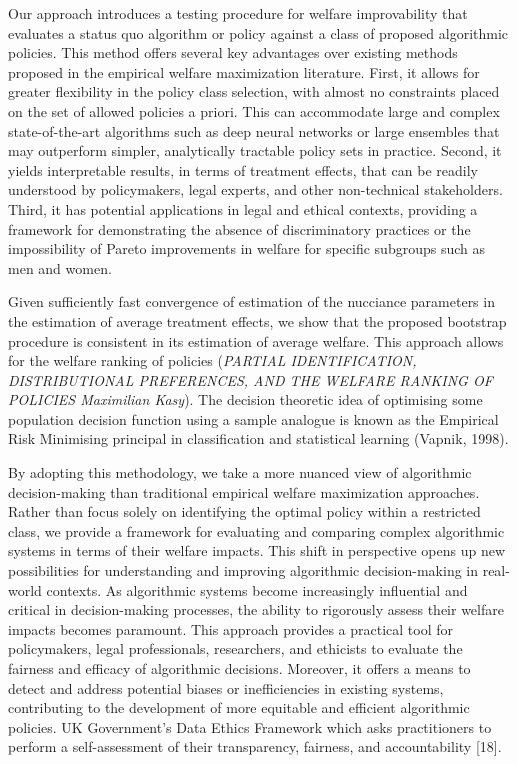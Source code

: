 \documentclass[
]{article}
\begin{document}
Our approach introduces a testing procedure for welfare improvability
that evaluates a status quo algorithm or policy against a class of
proposed algorithmic policies. This method offers several key advantages
over existing methods proposed in the empirical welfare maximization
literature. First, it allows for greater flexibility in the policy class
selection, with almost no constraints placed on the set of allowed
policies a priori. This can accommodate large and complex
state-of-the-art algorithms such as deep neural networks or large
ensembles that may outperform simpler, analytically tractable policy
sets in practice. Second, it yields interpretable results, in terms of
treatment effects, that can be readily understood by policymakers, legal
experts, and other non-technical stakeholders. Third, it has potential
applications in legal and ethical contexts, providing a framework for
demonstrating the absence of discriminatory practices or the
impossibility of Pareto improvements in welfare for specific subgroups
such as men and women.

Given sufficiently fast convergence of estimation of the nucciance
parameters in the estimation of average treatment effects, we show that
the proposed bootstrap procedure is consistent in its estimation of
average welfare. This approach allows for the welfare ranking of
policies
(\textit{PARTIAL IDENTIFICATION, DISTRIBUTIONAL PREFERENCES, AND THE WELFARE RANKING OF POLICIES Maximilian Kasy}).
The decision theoretic idea of optimising some population decision
function using a sample analogue is known as the Empirical Risk
Minimising principal in classification and statistical learning (Vapnik,
1998).

By adopting this methodology, we take a more nuanced view of algorithmic
decision-making than traditional empirical welfare maximization
approaches. Rather than focus solely on identifying the optimal policy
within a restricted class, we provide a framework for evaluating and
comparing complex algorithmic systems in terms of their welfare impacts.
This shift in perspective opens up new possibilities for understanding
and improving algorithmic decision-making in real-world contexts. As
algorithmic systems become increasingly influential and critical in
decision-making processes, the ability to rigorously assess their
welfare impacts becomes paramount. This approach provides a practical
tool for policymakers, legal professionals, researchers, and ethicists
to evaluate the fairness and efficacy of algorithmic decisions.
Moreover, it offers a means to detect and address potential biases or
inefficiencies in existing systems, contributing to the development of
more equitable and efficient algorithmic policies. UK Government's Data
Ethics Framework which asks practitioners to perform a self-assessment
of their transparency, fairness, and accountability {[}18{]}.
\end{document}
